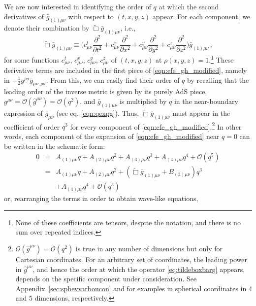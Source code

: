 \documentclass[aps,letterpaper,twocolumn,nofootinbib]{revtex4}
\numberwithin{equation}{section}
\begin{document}
We are now interested in identifying the order of $q$ at which the second derivatives of $ \bar{g}_{(1) \mu \nu}$ with respect to $(t,x,y,z)$ appear.
For each component, we denote their combination by $\tilde{\Box}\bar{g}_{(1)\mu\nu}$, i.e., 
\begin{equation}
\label{eq:tildeboxbarg}
\tilde{\Box}\bar{g}_{(1)\mu\nu}\equiv\biggl(c^t_{\mu\nu}\frac{\partial^2}{\partial t^2}+c^x_{\mu\nu}\frac{\partial^2}{\partial x^2}+c^y_{\mu\nu}\frac{\partial^2}{\partial y^2}+c^z_{\mu\nu}\frac{\partial^2}{\partial z^2}\biggr)\bar{g}_{(1)\mu\nu}\,,
\end{equation}
for some functions $c^t_{\mu\nu}$, $c^x_{\mu\nu}$, $c^y_{\mu\nu}$, $c^z_{\mu\nu}$ of $(t,x,y,z)$ at $\rho(x,y,z)=1$.\footnote{None of these coefficients are tensors, despite the notation, and there is no sum over repeated indices.}
These derivative terms are included in the first piece of \eqref{eqn:efe_gh_modified}, namely in $-\frac{1}{2}g^{\rho \sigma} \bar{g}_{\mu \nu, \rho \sigma}$. From this, we can easily find their order of $q$ by recalling that the leading order of the inverse metric is given by its purely AdS piece, $g^{\mu\nu}=\mathcal{O}(\hat{g}^{\mu\nu})=\mathcal{O}(q^{2})$, and $\bar{g}_{(1)\mu\nu}$ is multiplied by $q$ in the near-boundary expression of $\bar{g}_{\mu\nu}$ (see eq. \eqref{eqn:qexpg}). Thus, $\tilde{\Box}\bar{g}_{(1)\mu\nu}$ must appear in the coefficient of order $q^{3}$ for every component of \eqref{eqn:efe_gh_modified}.\footnote{$\mathcal{O}(\hat{g}^{\mu\nu})=\mathcal{O}(q^{2})$ is true in any number of dimensions but only for Cartesian coordinates. For an arbitrary set of coordinates, the leading power in $\hat{g}^{\mu\nu}$, and hence the order at which the operator \eqref{eq:tildeboxbarg} appears, depends on the specific component under consideration.
See Appendix~\ref{sec:sphevvarboucon} and \cite{Bantilan:2012vu} for examples in spherical coordinates in 4 and 5 dimensions, respectively.}
In other words, each component of the expansion of \eqref{eqn:efe_gh_modified} near $q=0$ can be written in the schematic form:
\begin{eqnarray}\label{eq:efefullexp}
0 
&=& A_{(1)\mu\nu}q+A_{(2)\mu\nu}q^2+A_{(3)\mu\nu}q^3+A_{(4)\mu\nu}q^4+\mathcal{O}(q^5) \nonumber \\
&=& A_{(1)\mu\nu}q+A_{(2)\mu\nu}q^2+(\tilde{\Box}\bar{g}_{(1)\mu\nu}+B_{(3)\mu\nu})q^3\nonumber \\
&&+A_{(4)\mu\nu}q^4  +\mathcal{O}(q^5)
\end{eqnarray}
or, rearranging the terms in order to obtain wave-like equations,
\end{document}
